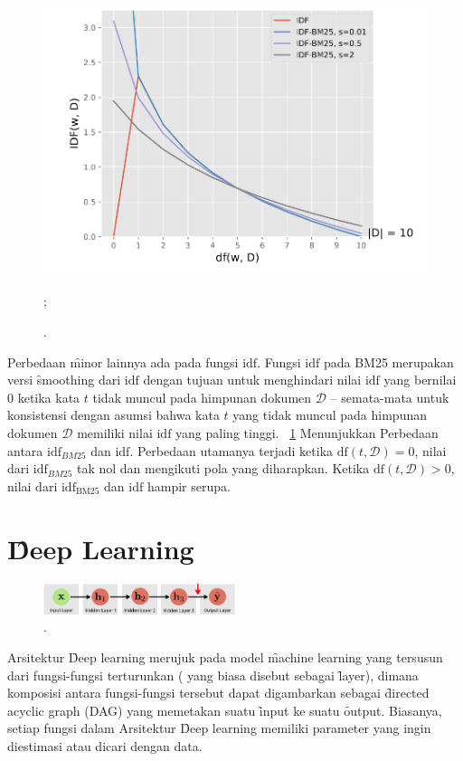    \begin{figure}
        \centering
        \includegraphics[width=1\textwidth]{assets/pics/smoothed-idf.png}
        \caption{\license.};
        \label{fig:smoothed-idf}
    \end{figure}

    
    Perbedaan \f{minor} lainnya ada pada fungsi $\text{idf}$. Fungsi $\text{idf}$ pada BM25 merupakan versi \f{smoothing} dari $\text{idf}$ dengan tujuan untuk menghindari nilai $\text{idf}$ yang bernilai 0 ketika kata $t$ tidak muncul pada himpunan dokumen $\mathcal{D}$ -- semata-mata untuk konsistensi dengan asumsi bahwa kata $t$ yang tidak muncul pada himpunan dokumen $\mathcal{D}$ memiliki nilai $\text{idf}$ yang paling tinggi. \pic~\ref{fig:smoothed-idf} Menunjukkan Perbedaan antara $\text{idf}_{BM25}$ dan $\text{idf}$. Perbedaan utamanya terjadi ketika $\text{df}(t,\mathcal{D}) = 0$, nilai dari  $\text{idf}_{BM25}$ tak nol dan mengikuti pola yang diharapkan. Ketika $\text{df}(t,\mathcal{D})>0$, nilai dari $\text{idf}_{\text{BM25}}$ dan $\text{idf}$ hampir serupa.

\section{\f{Deep Learning}}

    \begin{figure}
        \centering
        \includegraphics[width=0.50\textwidth]{assets/pics/dag-dl.png}
        \caption{\license.}
        \label{fig:deep-learning-FFN-dag}
    \end{figure}
    Arsitektur \f{Deep learning} merujuk pada model \f{machine learning} yang tersusun dari fungsi-fungsi terturunkan ( yang biasa disebut sebagai \f{layer}), dimana komposisi antara fungsi-fungsi tersebut dapat digambarkan sebagai \f{directed acyclic graph} (DAG) yang memetakan suatu \f{input} ke suatu \f{output}. Biasanya, setiap fungsi dalam Arsitektur \f{Deep learning} memiliki parameter yang ingin diestimasi atau dicari dengan data.
    
